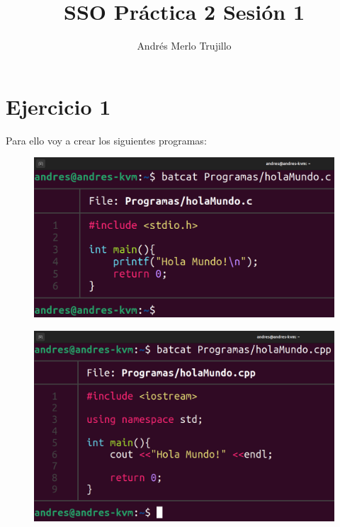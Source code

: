 \documentclass{article}
\title{SSO Práctica 2 Sesión 1}
\author{Andrés Merlo Trujillo}
\date{}
\begin{document}
\maketitle

\tableofcontents

\newpage

\section*{Ejercicio 1}

Para ello voy a crear los siguientes programas:

\begin{figure}[H]
    \includegraphics[width=\textwidth]{imagenes/Captura desde 2022-11-15 16-06-14.png}
\end{figure}


\begin{figure}[H]
    \includegraphics[width=\textwidth]{imagenes/Captura desde 2022-11-15 16-06-21.png}
\end{figure}
\end{document}
